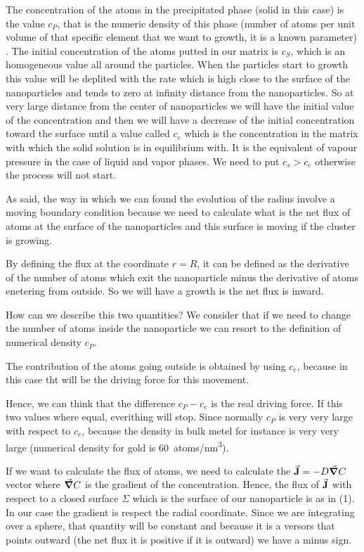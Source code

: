\documentclass[../main/main.tex]{subfiles}
\begin{document}
The concentration of the atoms in the precipitated phase (solid in this case) is the value \( c_P \), that is the numeric density of this phase (number of atoms per unit volume of that specific element that we want to growth, it is a known parameter) . The initial concentration of the atoms putted in our matrix is \( c_S \), which is an homogeneous value all around the particles. When the particles start to growth this value will be deplited with the rate which is high close to the surface of the nanoparticles and tends to zero at infinity distance from the nanoparticles.
So at very large distance from the center of nanoparticles we will have the initial value of the concentration and then we will have a decrease of the initial concentration toward the surface until a value called \( c_e  \) which is the concentration in the matrix with which the solid solution is in equilibrium with. It is the equivalent of vapour pressure in the case of liquid and vapor phases. We need to put \( c_s>c_e \) otherwise the process will not start.

As said, the way in which we can found the evolution of the radius involve a moving boundary condition because we need to calculate what is the net flux of atoms at the surface of the nanoparticles and this surface is moving if the cluster is growing.

By defining the flux at the coordinate \( r=R \), it can be defined as the derivative of the number of atoms which exit the nanoparticle minus the derivative of atoms enetering from outside.
So we will have a growth is the net flux is inward.

How can we describe this two quantities? We consider that if we need to change the number of atoms inside the nanoparticle we can resort to the definition of numerical density \( c_P \).

The contribution of the atoms going outside is obtained by using \( c_e \), because in this case tht will be the driving force for this movement.

Hence, we can think that the difference \( c_P-c_e \) is the real driving force. If this two values where equal, everithing will stop.
Since normally \( c_P \) is very very large with respect to \( c_e \), because the density in bulk metel for instance is very very large (numerical density for gold is \SI{60}{atoms/nm^3}).

If we want to calculate the flux of atoms, we need to calculate the \( \va{J}= -D \va{\grad }C \) vector where \(\va{\grad }C  \) is the gradient of the concentration.
Hence, the flux of \( \va{J} \) with respect to a closed surface \( \Sigma  \) which is the surface of our nanoparticle is as in (1). In our case the gradient is respect the radial coordinate. Since we are integrating over a sphere, that quantity will be constant and because it is a versors that points outward (the net flux it is positive if it is outward) we have a minus sign.
\end{document}
